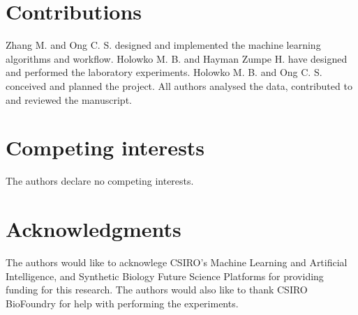 \documentclass{article}
\begin{document}
\section*{Contributions}
Zhang M. and Ong C. S. designed and implemented the machine learning algorithms and workflow. Holowko M. B. and Hayman Zumpe H. have designed and performed the laboratory experiments. Holowko M. B. and Ong C. S. conceived and planned the project. All authors analysed the data, contributed to and reviewed the manuscript.

\section*{Competing interests}
The authors declare no competing interests.

\section*{Acknowledgments}
The authors would like to acknowlege CSIRO's Machine Learning and Artificial Intelligence, and Synthetic Biology Future Science Platforms for providing funding for this research. The authors would also like to thank CSIRO BioFoundry for help with performing the experiments.


\newpage

\printbibliography

\clearpage

\setcounter{figure}{0}
\makeatletter
\renewcommand{\thefigure}{S\@arabic\c@figure}
\makeatother
\appendix

\end{document}
